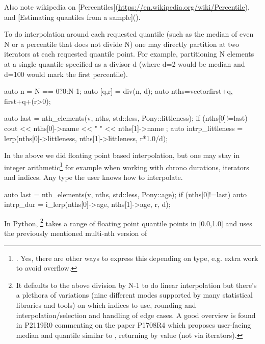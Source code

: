 Also note wikipedia on [Percentiles](\url{https://en.wikipedia.org/wiki/Percentile}), and [Estimating quantiles from a
sample]().

\enlargethispage*{-8em}

To do interpolation around each requested quantile (such as the median of even N or a percentile that does not divide N) one may directly partition at two iterators at each requested quantile point. For example, partitioning N elements at a single quantile specified as a divisor d (where d=2 would be median and d=100 would mark the first percentile).


\begin{codeblock}
auto n = N == 0?0:N-1;
auto [q,r] = div(n, d);
auto nths=vector{first+q, first+q+(r>0)}; 
\end{codeblock}

\begin{codeblock}
auto last = nth_elements(v, nths, std::less{}, Pony::littleness);
if (nths[0]!=last){
  cout << nths[0]->name << " " << nths[1]->name ; 
  auto intrp_littleness = lerp(nths[0]->littleness, nths[1]->littleness, r*1.0/d);
}
\end{codeblock}

In the above we did floating point based interpolation, but 
one may stay in integer arithmetic\footnote{. Yes, there are other ways to express this depending on type, e.g. extra work to avoid overflow.}
 for example when working with chrono durations, iterators and indices. Any type the user knows how to interpolate.
 
\begin{codeblock}
auto last = nth_elements(v, nths, std::less{}, Pony::age);
if (nths[0]!=last){
  auto intrp_dur = i_lerp(nths[0]->age, nths[1]->age, r, d);
}
\end{codeblock}
\label{quantileanything}

In Python, %
\footnote{
It defaults to the above division by N-1 to do linear interpolation but there's a plethora of variations (nine different modes supported by many statistical libraries and tools) on which indices to use, rounding and interpolation/\mbox{selection} and handling of edge cases. 
A good overview is found in P2119R0 commenting on the paper P1708R4  which proposes user-facing median and quantile similar to , returning by value (not via iterators).}
 takes a range of floating point quantile points in [0.0,1.0] and uses the previously mentioned multi-nth version of %

